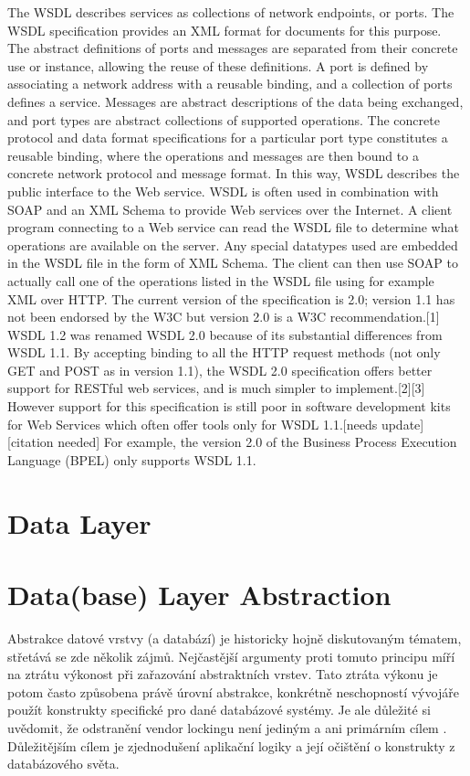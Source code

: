 The WSDL describes services as collections of network endpoints, or ports. The WSDL specification provides an XML format for documents for this purpose. The abstract definitions of ports and messages are separated from their concrete use or instance, allowing the reuse of these definitions. A port is defined by associating a network address with a reusable binding, and a collection of ports defines a service. Messages are abstract descriptions of the data being exchanged, and port types are abstract collections of supported operations. The concrete protocol and data format specifications for a particular port type constitutes a reusable binding, where the operations and messages are then bound to a concrete network protocol and message format. In this way, WSDL describes the public interface to the Web service.
WSDL is often used in combination with SOAP and an XML Schema to provide Web services over the Internet. A client program connecting to a Web service can read the WSDL file to determine what operations are available on the server. Any special datatypes used are embedded in the WSDL file in the form of XML Schema. The client can then use SOAP to actually call one of the operations listed in the WSDL file using for example XML over HTTP.
The current version of the specification is 2.0; version 1.1 has not been endorsed by the W3C but version 2.0 is a W3C recommendation.[1] WSDL 1.2 was renamed WSDL 2.0 because of its substantial differences from WSDL 1.1. By accepting binding to all the HTTP request methods (not only GET and POST as in version 1.1), the WSDL 2.0 specification offers better support for RESTful web services, and is much simpler to implement.[2][3] However support for this specification is still poor in software development kits for Web Services which often offer tools only for WSDL 1.1.[needs update][citation needed] For example, the version 2.0 of the Business Process Execution Language (BPEL) only supports WSDL 1.1.




\section{Data Layer}

\section{Data(base) Layer Abstraction}
Abstrakce datové vrstvy (a databází) je historicky hojně diskutovaným tématem, %
střetává se zde několik zájmů. Nejčastější argumenty proti tomuto principu míří na 
ztrátu výkonost při zařazování abstraktních vrstev. Tato ztráta výkonu je potom často způsobena 
právě úrovní abstrakce, konkrétně neschopností vývojáře použít konstrukty specifické pro dané databázové systémy. 
Je ale důležité si uvědomit, že odstranění vendor lockingu není jediným a ani primárním cílem .
Důležitějším cílem je zjednodušení aplikační logiky a její očištění o konstrukty z databázového světa. 

